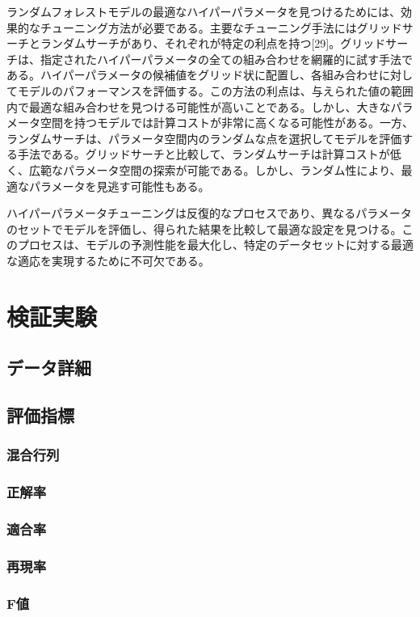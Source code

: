 \documentclass[platex]{suribt}
\begin{document}
ランダムフォレストモデルの最適なハイパーパラメータを見つけるためには、効果的なチューニング方法が必要である。主要なチューニング手法にはグリッドサーチとランダムサーチがあり、それぞれが特定の利点を持つ[29]。グリッドサーチは、指定されたハイパーパラメータの全ての組み合わせを網羅的に試す手法である。ハイパーパラメータの候補値をグリッド状に配置し、各組み合わせに対してモデルのパフォーマンスを評価する。この方法の利点は、与えられた値の範囲内で最適な組み合わせを見つける可能性が高いことである。しかし、大きなパラメータ空間を持つモデルでは計算コストが非常に高くなる可能性がある。一方、ランダムサーチは、パラメータ空間内のランダムな点を選択してモデルを評価する手法である。グリッドサーチと比較して、ランダムサーチは計算コストが低く、広範なパラメータ空間の探索が可能である。しかし、ランダム性により、最適なパラメータを見逃す可能性もある。

ハイパーパラメータチューニングは反復的なプロセスであり、異なるパラメータのセットでモデルを評価し、得られた結果を比較して最適な設定を見つける。このプロセスは、モデルの予測性能を最大化し、特定のデータセットに対する最適な適応を実現するために不可欠である。


\chapter{検証実験}
\section{データ詳細}
\section{評価指標}
\subsection{混合行列}
\subsection{正解率}
\subsection{適合率}
\subsection{再現率}
\subsection{F値}
\end{document}
